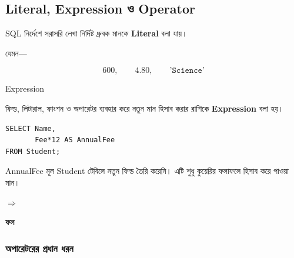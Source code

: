 \subsection{Literal, Expression ও Operator}

\begin{definitionbox}{}

SQL নির্দেশে সরাসরি লেখা নির্দিষ্ট ধ্রুবক মানকে
\textbf{Literal} বলা যায়।

\end{definitionbox}

যেমন—

\[
600,
\qquad
4.80,
\qquad
\texttt{'Science'}
\]

\begin{definitionbox}{Expression}

ফিল্ড, লিটারাল, ফাংশন ও অপারেটর ব্যবহার করে নতুন মান
হিসাব করার রাশিকে \textbf{Expression} বলা হয়।

\end{definitionbox}

\noindent\par\smallskip



\begin{minipage}{\linewidth}

\noindent\begin{minipage}[c]{.53\linewidth}
\begin{verbatim}
SELECT Name,
       Fee*12 AS AnnualFee
FROM Student;
\end{verbatim}
\smallskip\small AnnualFee মূল Student টেবিলে নতুন ফিল্ড তৈরি করেনি।
এটি শুধু কুয়েরির ফলাফলে হিসাব করে পাওয়া মান।

\end{minipage}\hfill\begin{minipage}[c]{.04\linewidth}\raggedright{\color{chSixTeal}$\Rightarrow$}\end{minipage}\hfill
\begin{minipage}[c]{.40\linewidth}\raggedright\footnotesize\setlength{\tabcolsep}{2pt}\textbf{ফল}\par\smallskip
{}
\end{minipage}
\end{minipage}
\subsubsection{অপারেটরের প্রধান ধরন}

